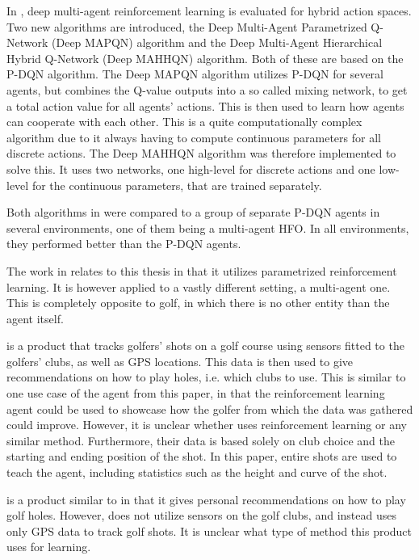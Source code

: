 \documentclass{kththesis}
\begin{document}
In \textcite{fu2019deep}, deep multi-agent reinforcement learning is evaluated for hybrid action spaces. Two new algorithms are introduced, the Deep Multi-Agent Parametrized Q-Network (Deep MAPQN) algorithm and the Deep Multi-Agent Hierarchical Hybrid Q-Network (Deep MAHHQN) algorithm. Both of these are based on the P-DQN algorithm. The Deep MAPQN algorithm utilizes P-DQN for several agents, but combines the Q-value outputs into a so called mixing network, to get a total action value for all agents' actions. This is then used to learn how agents can cooperate with each other. This is a quite computationally complex algorithm due to it always having to compute continuous parameters for all discrete actions. The Deep MAHHQN algorithm was therefore implemented to solve this. It uses two networks, one high-level for discrete actions and one low-level for the continuous parameters, that are trained separately. 

Both algorithms in \textcite{fu2019deep} were compared to a group of separate P-DQN agents in several environments, one of them being a multi-agent HFO. In all environments, they performed better than the P-DQN agents. 

The work in \textcite{fu2019deep} relates to this thesis in that it utilizes parametrized reinforcement learning. It is however applied to a vastly different setting, a multi-agent one. This is completely opposite to golf, in which there is no other entity than the agent itself.

\textcite{ArccosGo0:online} is a product that tracks golfers' shots on a golf course using sensors fitted to the golfers' clubs, as well as GPS locations. This data is then used to give recommendations on how to play holes, i.e. which clubs to use. This is similar to one use case of the agent from this paper, in that the reinforcement learning agent could be used to showcase how the golfer from which the data was gathered could improve. However, it is unclear whether \textcite{ArccosGo0:online} uses reinforcement learning or any similar method. Furthermore, their data is based solely on club choice and the starting and ending position of the shot. In this paper, entire shots are used to teach the agent, including statistics such as the height and curve of the shot.

\textcite{HelloBir63:online} is a product similar to \textcite{ArccosGo0:online} in that it gives personal recommendations on how to play golf holes. However, \textcite{HelloBir63:online} does not utilize sensors on the golf clubs, and instead uses only GPS data to track golf shots. It is unclear what type of method this product uses for learning.
\end{document}
